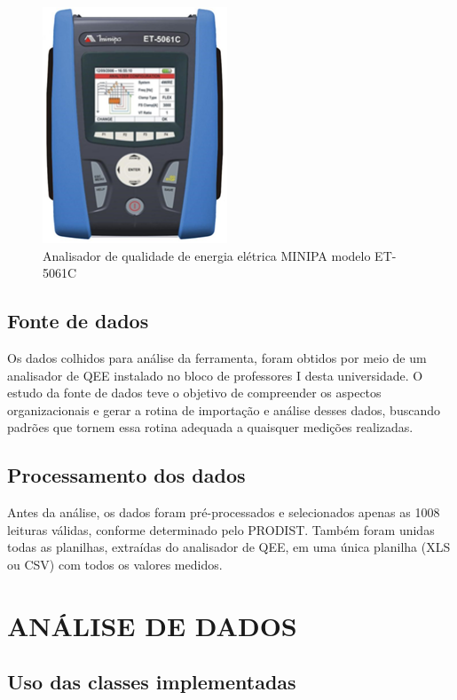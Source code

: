 \begin{figure}[H]
	\centering
	\caption{Analisador de qualidade de energia elétrica MINIPA modelo ET-5061C}
	\label{fig:analisador_qee}
	\includegraphics[width=5.5cm]{illustrations/figures/analisador_qee.png}
\end{figure}

\subsection{Fonte de dados}

Os dados colhidos para análise da ferramenta, foram obtidos por meio de um analisador de QEE instalado no bloco de professores I desta universidade. O estudo da fonte de dados teve o objetivo de compreender os aspectos organizacionais e gerar a rotina de importação e análise desses dados, buscando padrões que tornem essa rotina adequada a quaisquer medições realizadas.

\subsection{Processamento dos dados}

Antes da análise, os dados foram pré-processados e selecionados apenas as 1008 leituras válidas, conforme determinado pelo PRODIST. Também foram unidas todas as planilhas, extraídas do analisador de QEE, em uma única planilha (XLS ou CSV) com todos os valores medidos.

\section{ANÁLISE DE DADOS}

\subsection{Uso das classes implementadas}

